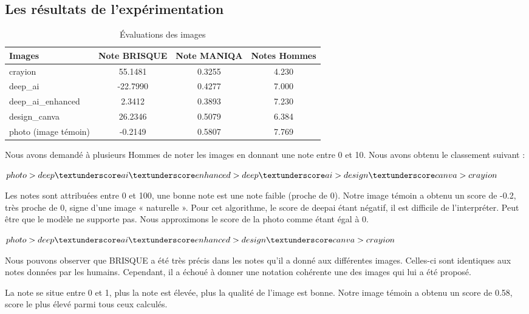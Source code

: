 \documentclass{ieeeaccess}
\begin{document}
\subsection{Les résultats de l'expérimentation}

\begin{table}[h]
\caption{Évaluations des images}
\label{table_images}
\setlength{\tabcolsep}{1.8pt}
\begin{tabular}{|l|c|c|c|}
    \hline
    \textbf{Images} & \textbf{Note BRISQUE} & \textbf{Note MANIQA} & \textbf{Notes Hommes} \\
    \hline
    crayion & 55.1481 & 0.3255 & 4.230 \\
    deep\_ai & -22.7990 & 0.4277 & 7.000 \\
    deep\_ai\_enhanced & 2.3412 & 0.3893 & 7.230 \\
    design\_canva & 26.2346 & 0.5079 & 6.384 \\
    photo (image témoin) & -0.2149 & 0.5807 & 7.769 \\
    \hline
\end{tabular}
\end{table}

 Nous avons demandé à plusieurs Hommes de noter les images en donnant une note entre 0 et 10. Nous avons obtenu le classement suivant :

$photo > deep\textunderscore ai\textunderscore enhanced > deep\textunderscore ai > design\textunderscore canva > crayion$

 Les notes sont attribuées entre 0 et 100, une bonne note est une note faible (proche de 0). Notre image témoin a obtenu un score de -0.2, très proche de 0, signe d’une image « naturelle ». Pour cet algorithme, le score de deepai étant négatif, il est difficile de l’interpréter. Peut être que le modèle ne supporte pas. Nous approximons le score de la photo comme étant égal à 0.

$photo > deep\textunderscore ai\textunderscore enhanced > design\textunderscore canva > crayion$ 

Nous pouvons observer que BRISQUE a été très précis dans les notes qu’il a donné aux différentes images. Celles-ci sont identiques aux notes données par les humains. Cependant, il a échoué à donner une notation cohérente une des images qui lui a été proposé.

 La note se situe entre 0 et 1, plus la note est élevée, plus la qualité de l’image est bonne. Notre image témoin a obtenu un score de 0.58, score le plus élevé parmi tous ceux calculés. 
\end{document}
